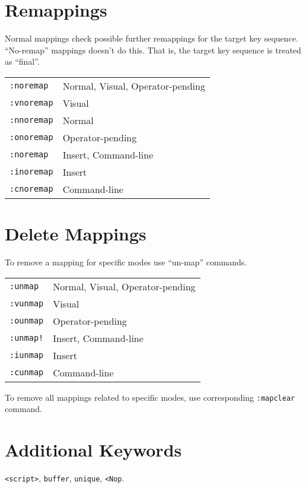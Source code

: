 \documentclass{article}
\begin{document}
\section{Remappings}
Normal mappings check possible further remappings for the target key sequence.
``No-remap'' mappings doesn't do this. That is, the target key sequence is treated as ``final''.
\begin{table}
  \centering
  \begin{tabular}{ll}
    \verb|:noremap|&Normal, Visual, Operator-pending\\
    \verb|:vnoremap|&Visual\\
    \verb|:nnoremap|&Normal\\
    \verb|:onoremap|&Operator-pending\\
    \verb|:noremap|&Insert, Command-line\\
    \verb|:inoremap|&Insert\\
    \verb|:cnoremap|&Command-line
  \end{tabular}
\end{table}
\section{Delete Mappings}
To remove a mapping for specific modes use ``un-map'' commands.
\begin{table}
  \centering
  \begin{tabular}{ll}
    \verb|:unmap|&Normal, Visual, Operator-pending\\
    \verb|:vunmap|&Visual\\
    \verb|:ounmap|&Operator-pending\\
    \verb|:unmap!|&Insert, Command-line\\
    \verb|:iunmap|&Insert\\
    \verb|:cunmap|&Command-line
  \end{tabular}
\end{table}

To remove all mappings related to specific modes, use corresponding \verb|:mapclear| command.
\section{Additional Keywords}
\verb|<script>|, \verb|buffer|, \verb|unique|, \verb|<Nop|.
\end{document}
